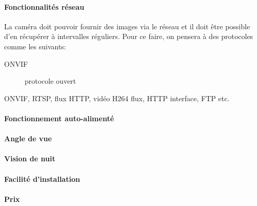 \paragraph{Fonctionnalités réseau}
La caméra doit pouvoir fournir des images via le réseau et il doit être possible d'en récupérer à intervalles réguliers. Pour ce faire, on pensera à des protocoles comme les suivants: 
\begin{description}
    \item[ONVIF] \cite{wiki:onvif} protocole ouvert 
\end{description}


ONVIF, RTSP, flux HTTP, vidéo H264 flux, HTTP interface, FTP etc.

\paragraph{Fonctionnement auto-alimenté}

\paragraph{Angle de vue}
\paragraph{Vision de nuit}
\paragraph{Facilité d'installation}

\paragraph{Prix}
